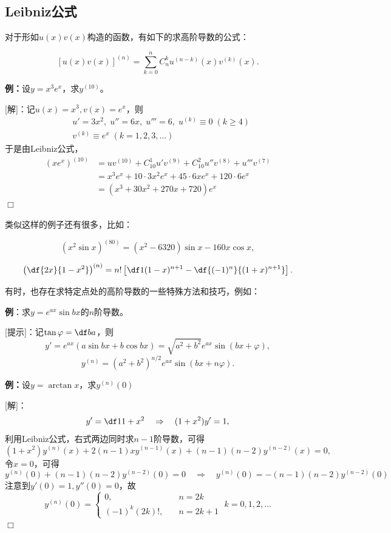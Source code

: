 \subsection{Leibniz公式}

对于形如$u(x)v(x)$构造的函数，有如下的求高阶导数的公式：

\begin{thx}
	$$\left[u(x)v(x)\right]^{(n)}=
	\sum\limits_{k=0}^nC_n^ku^{(n-k)}(x)v^{(k)}(x).$$
\end{thx}

{\bf 例：}设$y=x^3e^x$，求$y^{(10)}$。

[解]：记$u(x)=x^3,v(x)=e^x$，则
\begin{align*}
	& u'=3x^2, \; u''=6x, \; u'''=6, \; u^{(k)}\equiv 0\;(k\geq 4)\\
	& v^{(k)}\equiv e^x\;(k=1,2,3,\ldots)
\end{align*}
于是由Leibniz公式，
\begin{align*}
	(xe^x)^{(10)}
	&=uv^{(10)}+C_{10}^1u'v^{(9)}+C_{10}^2u''v^{(8)}+u'''v^{(7)}\\
	&=x^3e^x+10\cdot 3x^2e^x+45\cdot 6xe^x+120\cdot 6e^x\\
	&=(x^3+30x^2+270x+720)e^x
\end{align*}
\hfill$\Box$

类似这样的例子还有很多，比如：

$$(x^2\sin x)^{(80)}=(x^2-6320)\sin x-160x\cos x,$$

$$\left(\df{2x}{1-x^2}\right)^{(n)}=n!\left[\df1{(1-x)^{n+1}}
-\df{(-1)^n}{(1+x)^{n+1}}\right].$$

有时，也存在求特定点处的高阶导数的一些特殊方法和技巧，例如：

{\bf 例}：求$y=e^{ax}\sin bx$的$n$阶导数。

[提示]：记$\tan\varphi=\df ba$，则
$$y'=e^{ax}(a\sin bx+b\cos
bx)=\sqrt{a^2+b^2}e^{ax}\sin(bx+\varphi),$$
$$y^{(n)}=\left(a^2+b^2\right)^{n/2}e^{ax}\sin(bx+n\varphi).$$ 

{\bf 例：}设$y=\arctan x$，求$y^{(n)}(0)$

[解]：
$$y'=\df1{1+x^2}\quad \Rightarrow\quad (1+x^2)y'=1,$$
利用Leibniz公式，右式两边同时求$n-1$阶导数，可得
$$(1+x^2)y^{(n)}(x)+2(n-1)xy^{(n-1)}(x)+(n-1)(n-2)y^{(n-2)}(x)=0,$$
令$x=0$，可得
$$y^{(n)}(0)+(n-1)(n-2)y^{(n-2)}(0)=0\quad
\Rightarrow\quad y^{(n)}(0)=-(n-1)(n-2)y^{(n-2)}(0)$$
注意到$y'(0)=1,y''(0)=0$，故
$$y^{(n)}(0)=\left\{\begin{array}{ll}
0,\quad& n=2k\\
(-1)^k(2k)!,\quad& n=2k+1
\end{array}\right.\;k=0,1,2,\ldots$$
\hfill$\Box$

